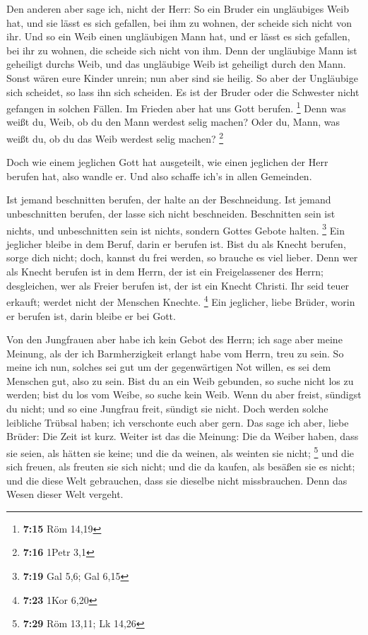  Den anderen aber sage ich, nicht der Herr: So ein Bruder
ein ungläubiges Weib hat, und sie lässt es sich gefallen, bei ihm zu
wohnen, der scheide sich nicht von ihr.  Und so ein Weib
einen ungläubigen Mann hat, und er lässt es sich gefallen, bei ihr zu
wohnen, die scheide sich nicht von ihm.  Denn der
ungläubige Mann ist geheiligt durchs Weib, und das ungläubige Weib ist
geheiligt durch den Mann. Sonst wären eure Kinder unrein; nun aber sind
sie heilig.  So aber der Ungläubige sich scheidet, so
lass ihn sich scheiden. Es ist der Bruder oder die Schwester nicht
gefangen in solchen Fällen. Im Frieden aber hat uns Gott berufen.
\footnote{\textbf{7:15} Röm 14,19}  Denn was weißt du,
Weib, ob du den Mann werdest selig machen? Oder du, Mann, was weißt du,
ob du das Weib werdest selig machen? \footnote{\textbf{7:16} 1Petr 3,1}

 Doch wie einem jeglichen Gott hat ausgeteilt, wie einen
jeglichen der Herr berufen hat, also wandle er. Und also schaffe ich's
in allen Gemeinden.

 Ist jemand beschnitten berufen, der halte an der
Beschneidung. Ist jemand unbeschnitten berufen, der lasse sich nicht
beschneiden.  Beschnitten sein ist nichts, und
unbeschnitten sein ist nichts, sondern Gottes Gebote halten. \footnote{\textbf{7:19}
  Gal 5,6; Gal 6,15}  Ein jeglicher bleibe in dem Beruf,
darin er berufen ist.  Bist du als Knecht berufen, sorge
dich nicht; doch, kannst du frei werden, so brauche es viel lieber.
 Denn wer als Knecht berufen ist in dem Herrn, der ist
ein Freigelassener des Herrn; desgleichen, wer als Freier berufen ist,
der ist ein Knecht Christi.  Ihr seid teuer erkauft;
werdet nicht der Menschen Knechte. \footnote{\textbf{7:23} 1Kor 6,20}
 Ein jeglicher, liebe Brüder, worin er berufen ist, darin
bleibe er bei Gott.

 Von den Jungfrauen aber habe ich kein Gebot des Herrn;
ich sage aber meine Meinung, als der ich Barmherzigkeit erlangt habe vom
Herrn, treu zu sein.  So meine ich nun, solches sei gut
um der gegenwärtigen Not willen, es sei dem Menschen gut, also zu sein.
 Bist du an ein Weib gebunden, so suche nicht los zu
werden; bist du los vom Weibe, so suche kein Weib.  Wenn
du aber freist, sündigst du nicht; und so eine Jungfrau freit, sündigt
sie nicht. Doch werden solche leibliche Trübsal haben; ich verschonte
euch aber gern.  Das sage ich aber, liebe Brüder: Die
Zeit ist kurz. Weiter ist das die Meinung: Die da Weiber haben, dass sie
seien, als hätten sie keine; und die da weinen, als weinten sie nicht;
\footnote{\textbf{7:29} Röm 13,11; Lk 14,26}  und die
sich freuen, als freuten sie sich nicht; und die da kaufen, als besäßen
sie es nicht;  und die diese Welt gebrauchen, dass sie
dieselbe nicht missbrauchen. Denn das Wesen dieser Welt vergeht.

